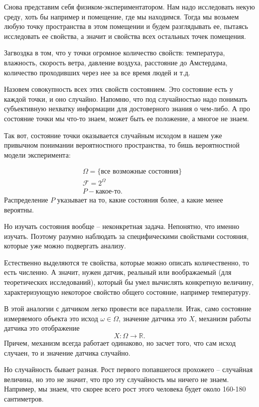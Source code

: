 \documentclass[a4paper,12pt]{article}
\newcommand{\R}{\mathbb{R}}
\newcounter{th-counter}
\begin{document}
Снова представим себя физиком-экспериментатором. Нам надо исследовать некую среду, хоть бы например и помещение, где мы находимся. Тогда мы возьмем любую точку пространства в этом помещении и будем разглядывать ее, пытаясь исследовать ее свойства, а значит и свойства всех остальных точек помещения.

Загвоздка в том, что у точки огромное количество свойств: температура, влажность, скорость ветра, давление воздуха, расстояние до Амстердама, количество проходивших через нее за все время людей и т.д.

Назовем совокупность всех этих свойств состоянием. Это состояние есть у каждой точки, и оно случайно. Напомню, что под случайностью надо понимать субъективную нехватку информации для достоверного знания о чем-либо. А про состояние точки мы что-то знаем, может быть ее положение, а многое не знаем.

Так вот, состояние точки оказывается случайным исходом в нашем уже привычном понимании вероятностного пространства, то бишь вероятностной модели эксперимента:

\begin{align*}
    &\Omega = \{ \text{все возможные состояния} \}\\
    &\mathcal{F} = 2^\Omega\\
    &P - \text{какое-то}.
\end{align*}
Распределение $P$ указывает на то, какие состояния более, а какие менее вероятны.

Но изучать состояния вообще -- неконкретная задача. Непонятно, что именно изучать. Поэтому разумно наблюдать за специфическими свойствами состояния, которые уже можно подвергать анализу.

Естественно выделяются те свойства, которые можно описать количественно, то есть численно. А значит, нужен датчик, реальный или воображаемый (для теоретических исследований), который бы умел вычислять конкретную величину, характеризующую некоторое свойство общего состояние, например температуру.

В этой аналогии с датчиком легко провести все параллели. Итак, само состояние измеряемого объекта это исход $\omega \in \Omega$, значение датчика это $X$, механизм работы датчика это отображение
\[
    X: \Omega \rightarrow \R.
\]
Причем, механизм всегда работает одинаково, но засчет того, что сам исход случаен, то и значение датчика случайно.

Но случайность бывает разная. Рост первого попавшегося прохожего -- случайная величина, но это не значит, что про эту случайность мы ничего не знаем. Например, мы знаем, что скорее всего рост этого человека будет около 160-180 сантиметров.
\end{document}
